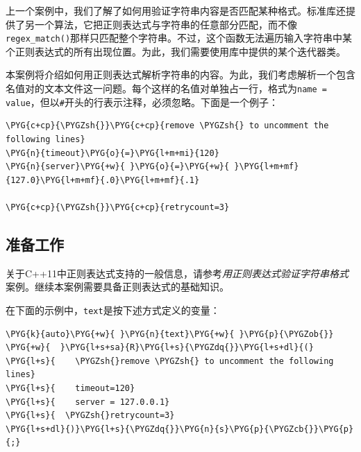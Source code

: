
上一个案例中，我们了解了如何用验证字符串内容是否匹配某种格式。标准库还提供了另一个算法，它把正则表达式与字符串的任意部分匹配，而不像\texttt{regex\_\allowbreak{}match()}那样只匹配整个字符串。不过，这个函数无法遍历输入字符串中某个正则表达式的所有出现位置。为此，我们需要使用库中提供的某个迭代器类。


本案例将介绍如何用正则表达式解析字符串的内容。为此，我们考虑解析一个包含名值对的文本文件这一问题。每个这样的名值对单独占一行，格式为\texttt{name = value}，但以\texttt{\#}开头的行表示注释，必须忽略。下面是一个例子：



\begin{codeblockbg}
\begin{Verbatim}[commandchars=\\\{\},breaklines=true,breakanywhere=true,fontsize=\codefont,xleftmargin=17bp]
\PYG{c+cp}{\PYGZsh{}}\PYG{c+cp}{remove \PYGZsh{} to uncomment the following lines}
\PYG{n}{timeout}\PYG{o}{=}\PYG{l+m+mi}{120}
\PYG{n}{server}\PYG{+w}{ }\PYG{o}{=}\PYG{+w}{ }\PYG{l+m+mf}{127.0}\PYG{l+m+mf}{.0}\PYG{l+m+mf}{.1}

\PYG{c+cp}{\PYGZsh{}}\PYG{c+cp}{retrycount=3}
\end{Verbatim}
\end{codeblockbg}



\subsection{准备工作}



关于C++11中正则表达式支持的一般信息，请参考\textit{用正则表达式}\textit{验证字符串格式}案例。继续本案例需要具备正则表达式的基础知识。



在下面的示例中，\texttt{text}是按下述方式定义的变量：



\begin{codeblockbg}
\begin{Verbatim}[commandchars=\\\{\},breaklines=true,breakanywhere=true,fontsize=\codefont,xleftmargin=17bp]
\PYG{k}{auto}\PYG{+w}{ }\PYG{n}{text}\PYG{+w}{ }\PYG{p}{\PYGZob{}}
\PYG{+w}{  }\PYG{l+s+sa}{R}\PYG{l+s}{\PYGZdq{}}\PYG{l+s+dl}{(}
\PYG{l+s}{    \PYGZsh{}remove \PYGZsh{} to uncomment the following lines}
\PYG{l+s}{    timeout=120}
\PYG{l+s}{    server = 127.0.0.1}
\PYG{l+s}{  \PYGZsh{}retrycount=3}
\PYG{l+s+dl}{)}\PYG{l+s}{\PYGZdq{}}\PYG{n}{s}\PYG{p}{\PYGZcb{}}\PYG{p}{;}
\end{Verbatim}
\end{codeblockbg}


